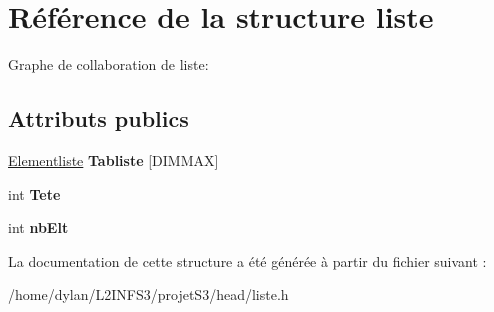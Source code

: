 \hypertarget{structliste}{}\section{Référence de la structure liste}
\label{structliste}


Graphe de collaboration de liste\+:
\subsection*{Attributs publics}
\begin{DoxyCompactItemize}
\item 
\mbox{\label{structliste_a78ae07a2a790f7cde605fdf5419cf67b}} 
\hyperlink{structs__arc__p}{Elementliste} {\bfseries Tabliste} \mbox{[}D\+I\+M\+M\+AX\mbox{]}
\item 
\mbox{\label{structliste_a5aa222084b1384a391d80f0d88bf15c2}} 
int {\bfseries Tete}
\item 
\mbox{\label{structliste_a9d7c35e9a7e1c88555a21254d33a7246}} 
int {\bfseries nb\+Elt}
\end{DoxyCompactItemize}


La documentation de cette structure a été générée à partir du fichier suivant \+:\begin{DoxyCompactItemize}
\item 
/home/dylan/\+L2\+I\+N\+F\+S3/projet\+S3/head/liste.\+h\end{DoxyCompactItemize}
